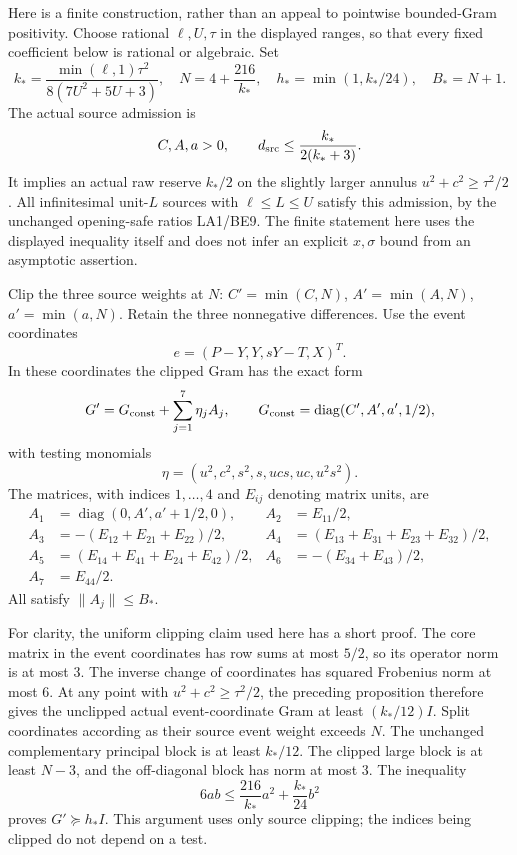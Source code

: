 \documentclass[11pt]{article}
\newcommand{\diag}{\operatorname{diag}}
\begin{document}
Here is a finite construction, rather than an appeal to pointwise
bounded-Gram positivity.  Choose rational $\ell,U,\tau$ in the displayed
ranges, so that every fixed coefficient below is rational or algebraic.
Set
\[
 k_* =\frac{\min(\ell,1)\tau^2}{8(7U^2+5U+3)},\quad
 N=4+\frac{216}{k_*},\quad h_* =\min(1,k_*/24),\quad B_*=N+1.
\]
The actual source admission is
\[
 C,A,a>0,\qquad
 d_{\rm src}\leq\frac{k_*}{2(k_*+3)}.             \label{eq:actual-admission}
\]
It implies an actual raw reserve $k_*/2$ on the slightly larger annulus
$u^2+c^2\geq\tau^2/2$.  All infinitesimal unit-$L$ sources with
$\ell\leq L\leq U$ satisfy this admission, by the unchanged opening-safe
ratios LA1/BE9.  The finite statement here uses the displayed inequality
itself and does not infer an explicit $x,\sigma$ bound from an
asymptotic assertion.

Clip the three source weights at $N$:
$C'=\min(C,N)$, $A'=\min(A,N)$,
$a'=\min(a,N)$.  Retain the three nonnegative differences.
Use the event coordinates
\[
 e=(P-Y,Y,sY-T,X)^T.
\]
In these coordinates the clipped Gram has the exact form
\[
 G'=G_{\rm const}+\sum_{j=1}^7\eta_j A_j,
 \qquad G_{\rm const}=\diag(C',A',a',1/2),
\]
with testing monomials
\[
 \eta=(u^2,c^2,s^2,s,ucs,uc,u^2s^2).
\]
The matrices, with indices $1,\ldots,4$ and $E_{ij}$ denoting matrix
units, are
\begin{align*}
 A_1&=\diag(0,A',a'+1/2,0),&A_2&=E_{11}/2,\\
 A_3&=-(E_{12}+E_{21}+E_{22})/2,
 &A_4&=(E_{13}+E_{31}+E_{23}+E_{32})/2,\\
 A_5&=(E_{14}+E_{41}+E_{24}+E_{42})/2,
 &A_6&=-(E_{34}+E_{43})/2,\\
 A_7&=E_{44}/2.
\end{align*}
All satisfy $\|A_j\|\leq B_*$.

For clarity, the uniform clipping claim used here has a short proof.
The core matrix in the event coordinates has row sums at most $5/2$,
so its operator norm is at most $3$.  The inverse change of coordinates
has squared Frobenius norm at most $6$.  At any point with
$u^2+c^2\geq\tau^2/2$, the preceding proposition therefore gives the
unclipped actual event-coordinate Gram at least $(k_*/12)I$.
Split coordinates according as their source event weight exceeds $N$.
The unchanged complementary principal block is at least $k_*/12$.
The clipped large block is at least $N-3$, and the off-diagonal
block has norm at most $3$.  The inequality
\[
 6ab\leq\frac{216}{k_*}a^2+\frac{k_*}{24}b^2
\]
proves $G'\succeq h_*I$.  This argument uses only source clipping;
the indices being clipped do not depend on a test.
\end{document}
